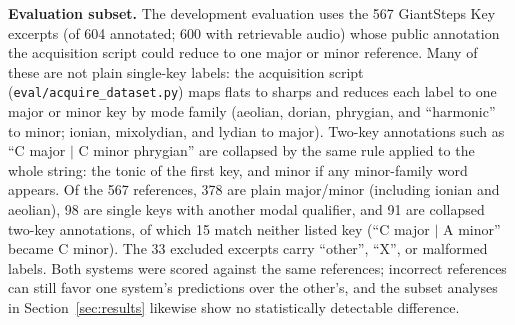 \documentclass{article}
\begin{document}
\textbf{Evaluation subset.} The development evaluation uses the 567 GiantSteps Key
excerpts (of 604 annotated; 600 with retrievable audio) whose public annotation the
acquisition script could reduce to one major or minor reference. Many of these are not
plain single-key labels: the acquisition script (\texttt{eval/acquire\_dataset.py}) maps flats to sharps and
reduces each label to one major or minor key by mode family (aeolian, dorian, phrygian,
and ``harmonic'' to minor; ionian, mixolydian, and lydian to major). Two-key annotations
such as ``C major $|$ C minor phrygian'' are collapsed by the same rule applied to the
whole string: the tonic of the first key, and minor if any minor-family word appears.
Of the 567 references, 378 are plain major/minor (including ionian and aeolian), 98 are
single keys with another modal qualifier, and 91 are collapsed two-key annotations, of
which 15 match neither listed key (``C major $|$ A minor'' became C minor). The 33
excluded excerpts carry ``other'', ``X'', or malformed labels. Both systems were scored
against the same references; incorrect references can still favor one system's
predictions over the other's, and the subset analyses in Section~\ref{sec:results}
likewise show no statistically detectable difference.
\end{document}
